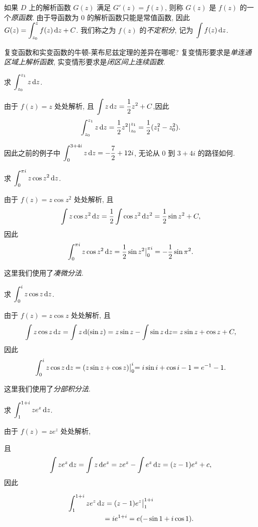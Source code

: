 如果 $D$ 上的解析函数 $G(z)$ 满足 $G'(z)=f(z)$, 则称 $G(z)$ 是 $f(z)$ 的一个\emph{原函数}.
由于导函数为 $0$ 的解析函数只能是常值函数,
因此 $\displaystyle G(z)=\int_{z_0}^zf(z)\,\mathrm{d} z+C$.
我们称之为 $f(z)$ 的\emph{不定积分}, 记为 \emph{$\displaystyle\int f(z)\,\mathrm{d} z$}.

复变函数和实变函数的牛顿-莱布尼兹定理的差异在哪呢?
复变情形要求是\emph{单连通区域上解析函数}, 实变情形要求是\emph{闭区间上连续函数}.

\begin{example}
	求 $\displaystyle\int_{z_0}^{z_1}z\,\mathrm{d} z$.
\end{example}

\begin{solution}
	由于 $f(z)=z$ 处处解析,
	{且 $\displaystyle\int z\,\mathrm{d} z=\frac{1}{2}  z^2+C$,因此
	\[\int_{z_0}^{z_1}z\,\mathrm{d} z=\frac{1}{2} z^2\big|_{z_0}^{z_1}=\frac{1}{2} (z_1^2-z_0^2).\]}
\end{solution}
因此之前的例子中 $\displaystyle\int_0^{3+4i}z\,\mathrm{d} z=-\frac72+12i$, 无论从 $0$ 到 $3+4i$ 的路径如何.

\begin{example}
	求 $\displaystyle\int_0^{\pi i}z\cos z^2\,\mathrm{d} z$.
\end{example}

\begin{solution}
	由于 $f(z)=z\cos z^2$ 处处解析,
	{且
	\[\int z\cos z^2\,\mathrm{d} z=\frac{1}{2}\int \cos z^2\,\mathrm{d} z^2=\frac{1}{2}\sin z^2+C,\]因此
	\[\int_0^{\pi i}z\cos z^2\,\mathrm{d} z=\frac{1}{2}\sin z^2\big|_0^{\pi i}=-\frac{1}{2}\sin \pi^2.\]}
\end{solution}

这里我们使用了\emph{凑微分法}.

\begin{example}
	求 $\displaystyle\int_0^i z\cos z\,\mathrm{d} z$.
\end{example}

\begin{solution}
	由于 $f(z)=z\cos z$ 处处解析,
	{且
		\[\int z\cos z\,\mathrm{d} z
		=\int z\,\mathrm{d}(\sin z)
		=z\sin z-\int \sin z\,\mathrm{d} z
		{=z\sin z+\cos z+C,}\]因此
		\[\int_0^i z\cos z\,\mathrm{d} z
		=(z\sin z+\cos z)\big|_0^i
		{=i\sin i+\cos i-1=e^{-1}-1.}
		\]}
\end{solution}

这里我们使用了\emph{分部积分法}.

\begin{example}
	求 $\displaystyle\int_1^{1+i} z e^z\,\mathrm{d} z$.
\end{example}

\begin{solution}
	由于 $f(z)=ze^z$ 处处解析,
	{且
	\[\int z e^z\,\mathrm{d} z=\int z\,\mathrm{d} e^z=ze^z-\int e^z\,\mathrm{d} z=(z-1)e^z+c,\]因此

		\begin{align*}
		\int_1^{1+i} z e^z\,\mathrm{d} z&=(z-1)e^z\big|_1^{1+i}\\
		&{=ie^{1+i}=e(-\sin 1+i\cos 1).}
		\end{align*}}
\end{solution}

